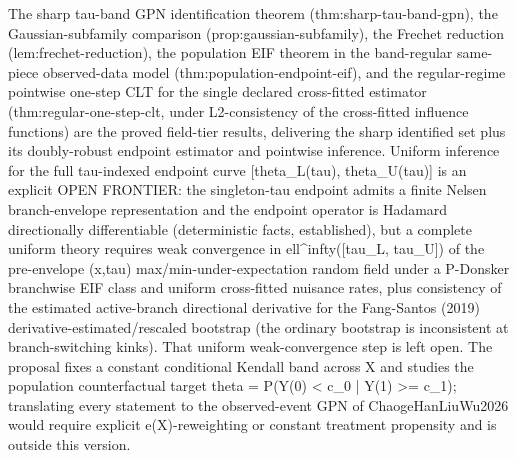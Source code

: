 \documentclass{article}
\begin{document}
The sharp tau-band GPN identification theorem (thm:sharp-tau-band-gpn), the Gaussian-subfamily comparison (prop:gaussian-subfamily), the Frechet reduction (lem:frechet-reduction), the population EIF theorem in the band-regular same-piece observed-data model (thm:population-endpoint-eif), and the regular-regime pointwise one-step CLT for the single declared cross-fitted estimator (thm:regular-one-step-clt, under L2-consistency of the cross-fitted influence functions) are the proved field-tier results, delivering the sharp identified set plus its doubly-robust endpoint estimator and pointwise inference. Uniform inference for the full tau-indexed endpoint curve [theta_L(tau), theta_U(tau)] is an explicit OPEN FRONTIER: the singleton-tau endpoint admits a finite Nelsen branch-envelope representation and the endpoint operator is Hadamard directionally differentiable (deterministic facts, established), but a complete uniform theory requires weak convergence in ell^infty([tau_L, tau_U]) of the pre-envelope (x,tau) max/min-under-expectation random field under a P-Donsker branchwise EIF class and uniform cross-fitted nuisance rates, plus consistency of the estimated active-branch directional derivative for the Fang-Santos (2019) derivative-estimated/rescaled bootstrap (the ordinary bootstrap is inconsistent at branch-switching kinks). That uniform weak-convergence step is left open. The proposal fixes a constant conditional Kendall band across X and studies the population counterfactual target theta = P(Y(0) < c_0 | Y(1) >= c_1); translating every statement to the observed-event GPN of ChaogeHanLiuWu2026 would require explicit e(X)-reweighting or constant treatment propensity and is outside this version.
\end{document}

